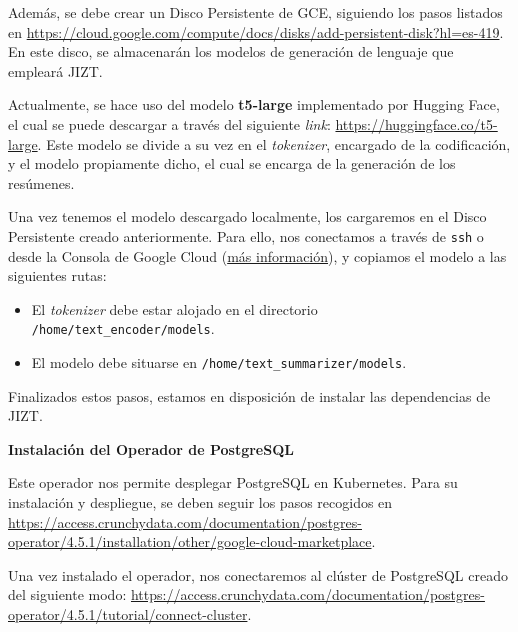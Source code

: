 Además, se debe crear un Disco Persistente de GCE, siguiendo los pasos listados en \href{https://cloud.google.com/compute/docs/disks/add-persistent-disk?hl=es-419}{https://cloud.google.com/compute/docs/disks/add-persistent-disk?hl=es-419}. En este disco, se almacenarán los modelos de generación de lenguaje que empleará JIZT.

Actualmente, se hace uso del modelo \textbf{t5-large} implementado por Hugging Face, el cual se puede descargar a través del siguiente \emph{link}: \href{https://huggingface.co/t5-large}{https://huggingface.\newline co/t5-large}. Este modelo se divide a su vez en el \emph{tokenizer}, encargado de la codificación, y el modelo propiamente dicho, el cual se encarga de la generación de los resúmenes.

Una vez tenemos el modelo descargado localmente, los cargaremos en el Disco Persistente creado anteriormente. Para ello, nos conectamos a través de \texttt{ssh} o desde la Consola de Google Cloud (\href{https://cloud.google.com/compute/docs/instances/connecting-to-instance?hl=es-419#console}{más información}), y copiamos el modelo a las siguientes rutas:

\vspace{-0.2cm}
\begin{itemize} [\textbullet]
	\tightlist
	\item El \emph{tokenizer} debe estar alojado en el directorio \\ \texttt{/home/text\_encoder/models}.
	\item El modelo debe situarse en \texttt{/home/text\_summarizer/models}.
\end{itemize}

Finalizados estos pasos, estamos en disposición de instalar las dependencias de JIZT.

\vspace{0.5cm}
\noindent
\textbf{Instalación del Operador de PostgreSQL}

Este operador nos permite desplegar PostgreSQL en Kubernetes. Para su instalación y despliegue, se deben seguir los pasos recogidos en \href{https://access.crunchydata.com/documentation/postgres-operator/4.5.1/installation/other/google-cloud-marketplace}{https://access.crunchydata.com/documentation/postgres-operator/4.5.1/\newline installation/other/google-cloud-marketplace}.

Una vez instalado el operador, nos conectaremos al clúster de PostgreSQL creado del siguiente modo: \href{https://access.crunchydata.com/documentation/postgres-operator/4.5.1/tutorial/connect-cluster}{https://access.crunchydata.com/documentation/\newline postgres-operator/4.5.1/tutorial/connect-cluster}.

